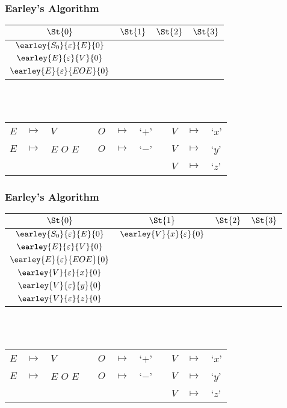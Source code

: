 \begin{frame}
	\frametitle{Earley's Algorithm}
	\centering
	\begin{tabular}{|c|c|c|c|}
		\hline
		$\St{0}$ & $\St{1}$ & $\St{2}$ & $\St{3}$ \\
		\hline
		$\earley{S_0}{\varepsilon}{E}{0}$ & & & \\
		$\earley{E}{\varepsilon}{V}{0}$   & & & \\
		$\earley{E}{\varepsilon}{EOE}{0}$ & & & \\
		\hline
	\end{tabular}

	\\~\\
	\vspace{0.5cm}
	\scriptsize
	\begin{tabular}{rclcrclcrcl}
		$E$ & $ \mapsto $ & $V$         && $O$ & $ \mapsto $ & `$+$' && $V$ & $ \mapsto $ & `$x$' \\
		$E$ & $ \mapsto $ & $E$ $O$ $E$ && $O$ & $ \mapsto $ & `$-$' && $V$ & $ \mapsto $ & `$y$' \\
		    &             &             &&     &             &       && $V$ & $ \mapsto $ & `$z$'
	\end{tabular}
\end{frame}

\begin{frame}
	\frametitle{Earley's Algorithm}
	\centering
	\begin{tabular}{|c|c|c|c|}
		\hline
		$\St{0}$                          & $\St{1}$ & $\St{2}$ & $\St{3}$ \\
		\hline
		$\earley{S_0}{\varepsilon}{E}{0}$ & $\earley{V}{x}{\varepsilon}{0}$ & &\\
		$\earley{E}{\varepsilon}{V}{0}$   & & & \\
		$\earley{E}{\varepsilon}{EOE}{0}$ & & & \\
		$\earley{V}{\varepsilon}{x}{0}$   & & & \\
		$\earley{V}{\varepsilon}{y}{0}$   & & & \\
		$\earley{V}{\varepsilon}{z}{0}$   & & & \\
		\hline
	\end{tabular}

	\\~\\
	\vspace{0.5cm}
	\scriptsize
	\begin{tabular}{rclcrclcrcl}
		$E$ & $ \mapsto $ & $V$         && $O$ & $ \mapsto $ & `$+$' && $V$ & $ \mapsto $ & `$x$' \\
		$E$ & $ \mapsto $ & $E$ $O$ $E$ && $O$ & $ \mapsto $ & `$-$' && $V$ & $ \mapsto $ & `$y$' \\
		    &             &             &&     &             &       && $V$ & $ \mapsto $ & `$z$'
	\end{tabular}
\end{frame}

